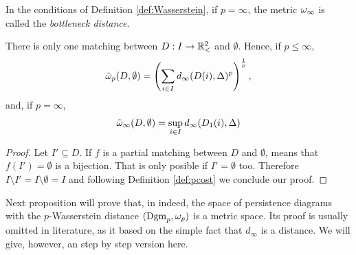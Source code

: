 \begin{definition}
    In the conditions of Definition \ref{def:Wasserstein}, if $ p = \infty $, the metric $ \omega_\infty $ is called the {\it bottleneck distance}.
\end{definition}

\begin{proposition} \label{prop-empty-mathing-distance}
    There is only one matching between $ D: I \to \mathbb{R}_<^2 $ and $ \emptyset $. Hence, if $ p \leq \infty $,
    $$
        \tilde \omega_p(D, \emptyset) = \left(\sum_{i\in I} d_\infty(D(i), \Delta)^p\right)^{\frac{1}{p}},
    $$
    and, if $ p = \infty $,
    $$
        \tilde \omega_\infty(D, \emptyset) = \sup_{i\in I} d_\infty(D_1(i), \Delta)
    $$
\end{proposition}
\begin{proof}
    Let $ I' \subseteq D $. If $ f $ is a partial matching between $ D $ and $ \emptyset $, means that $ f(I') = \emptyset$ is a bijection. That is only posible if $ I' = \emptyset $ too. Therefore $ I \setminus I' = I \setminus \emptyset = I $ and following Definition \ref{def:pcost} we conclude our proof.
\end{proof}

Next proposition will prove that, in indeed, the space of persistence diagrams with the $p$-Wasserstein distance $(\operatorname{Dgm}_p, \omega_p)$ is a metric space. Its proof is usually omitted in literature, as it based on the simple fact that $ d_\infty $ is a distance. We will give, however, an step by step version here.

